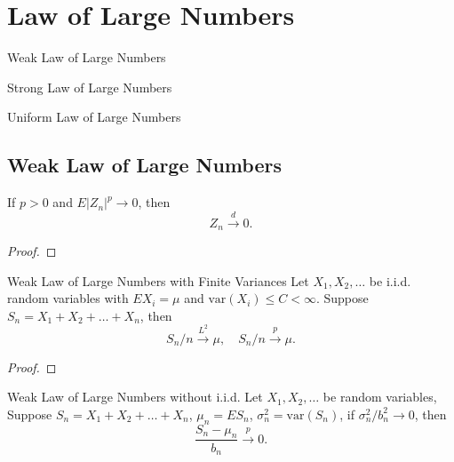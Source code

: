\chapter{Law of Large Numbers}

\begin{introduction}
    \item Weak Law of Large Numbers
    \item Strong Law of Large Numbers
    \item Uniform Law of Large Numbers
\end{introduction}

\section{Weak Law of Large Numbers}

\begin{lemma}{}{}
    If $p>0$ and $E\left|Z_{n}\right|^{p}\rightarrow 0$, then
    \begin{equation}
        Z_{n}\stackrel{d}{\rightarrow}0.
    \end{equation}
\end{lemma}

\begin{proof}
    
\end{proof}

\begin{theorem}{Weak Law of Large Numbers with Finite Variances}{}
    Let $X_1,X_2,\ldots$ be i.i.d. random variables with $EX_i=\mu$ and $\text{var}(X_i)\leq C<\infty$. Suppose $S_n=X_1+X_2+\ldots+X_n$, then
    \begin{equation}
        S_n/n\stackrel{L^2}{\rightarrow}\mu,\quad S_n/n\stackrel{p}{\rightarrow}\mu.
    \end{equation}
\end{theorem}

\begin{proof}
    
\end{proof}

\begin{theorem}{Weak Law of Large Numbers without i.i.d.}{}
    Let $X_1,X_2,\ldots$ be random variables, Suppose $S_n=X_1+X_2+\ldots+X_n$, $\mu_n=ES_n$, $\sigma_n^2=\text{var}(S_n)$, if $\sigma_n^2/b_n^2\rightarrow 0$, then
    \begin{equation}
        \frac{S_n-\mu_n}{b_n}\stackrel{p}{\rightarrow}0.
    \end{equation}
\end{theorem}

